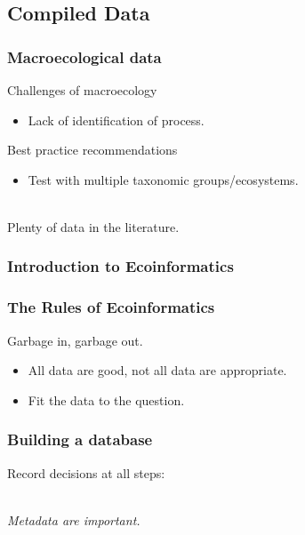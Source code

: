 \documentclass[14pt]{beamer}
\begin{document}
\subsection{Compiled Data}
\begin{frame}[t]
\frametitle{Macroecological data}
Challenges of macroecology\\
\begin{small}
\begin{itemize}
\item Lack of identification of process.
\end{itemize}
\end{small}
Best practice recommendations
\begin{small}
\begin{itemize}
\item Test with multiple taxonomic groups/ecosystems. 
\end{itemize}
\end{small} 
\begin{large}
~\\
Plenty of data in the literature.
\end{large}
\end{frame}


\subsubsection{Introduction to Ecoinformatics}
\begin{frame}[t]
\frametitle{The Rules of Ecoinformatics}
\begin{Large}
Garbage in, garbage out.\\
\end{Large}
\begin{itemize}
\item All data are good, not all data are appropriate.
\item Fit the data to the question.
\end{itemize}
\end{frame}

\begin{frame}[t]{}
\frametitle{Building a database}
\begin{center}
Record decisions at all steps:\\
~\\
\begin{large}
\emph{Metadata are important.}
\end{large}
\end{center}
\end{frame}
\end{document}
